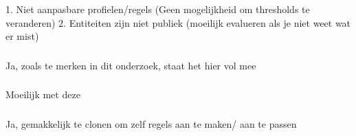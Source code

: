 \subsubsection{}
\label{}


1. Niet aanpasbare profielen/regels (Geen mogelijkheid om thresholds te veranderen)
2. Entiteiten zijn niet publiek (moeilijk evalueren als je niet weet wat er mist)

\subsubsection{}
\label{}

Ja, zoals te merken in dit onderzoek, staat het hier vol mee

\subsubsection{}
\label{}

Moeilijk met deze

\subsubsection{}
\label{}

Ja, gemakkelijk te clonen om zelf regels aan te maken/ aan te passen

\section{}
\label{sec:res-eigen-gedefinieerde-dlp-regels}


\subsection{}
\label{sec:functionaliteit-resultaten-eigen}

